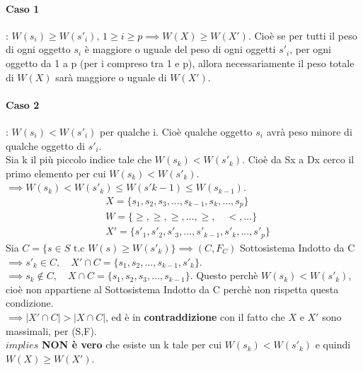 \paragraph*{Caso 1}: $W(s_i) \geq W(s'_i), \,1 \geq i \geq p \implies W(X) \geq W(X')$. Cioè se per tutti
il peso di ogni oggetto $s_i$ è maggiore o uguale del peso di ogni oggetti $s'_i$, per ogni oggetto da 1 a p (per i
compreso tra 1 e p), allora necessariamente il peso totale di $W(X)$ sarà maggiore o uguale di $W(X')$.
\paragraph*{Caso 2}: $W(s_i) < W(s'_i)$ per qualche i. Cioè qualche oggetto $s_i$ avrà peso minore di qualche oggetto
di $s'_i$.\\
Sia k il più piccolo indice tale che $W(s_k) < W(s'_k)$. Cioè da Sx a Dx cerco il primo elemento per cui $W(s_k) < W(s'_k)$.\\
$\implies W(s_k) < W(s'_k) \leq W(s'{k-1}) \leq W(s_{k-1})$.
\begin{align*}
    &X = \{s_1, s_2, s_3, ..., s_{k-1}, s_k, ..., s_p\}\\
    &W = \{ \geq, \geq, \geq, ..., \geq,\quad <, ...\}\\
    &X'= \{s'_1, s'_2, s'_3, ..., s'_{k-1}, s'_k, ..., s'_p\}
\end{align*}
Sia $C = \{s \in S \text{ t.c } W(s) \geq W(s'_k)\} \implies (C, F_C)$ Sottosistema Indotto da C\\
$\implies s'_k \in C, \quad X' \cap C = \{s_1, s_2, \dots, s_{k-1}, s'_k\}$.\\
$\implies s_k \notin C, \quad X \cap C = \{s_1, s_2, s_3, \dots, s_{k-1}\}$. 
Questo perchè $W(s_k) < W(s'_k)$, cioè non appartiene al Sottosistema Indotto da C perchè
non rispetta questa condizione.\\
$\implies |X' \cap C| > |X \cap C|$, ed è in \textbf{contraddizione} con il fatto che $X$ e $X'$ sono massimali,
per (S,F).\\
$implies$ \textbf{NON è vero} che esiste un k tale per cui $W(s_k) < W(s'_k)$ e quindi $W(X) \geq W(X')$.
